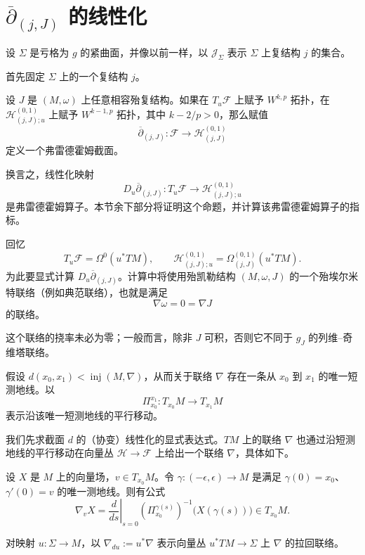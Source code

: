 \section{\texorpdfstring{$\overline\partial_{(j,J)}$}{dbar(j,J)} 的线性化}
\label{sec:linearizations-dbar-jj}
\setcounter{equation}{4}

设 $\Sigma$ 是亏格为 $g$ 的紧曲面，并像以前一样，以 $\mathcal J_\Sigma$ 表示 $\Sigma$ 上复结构 $j$ 的集合。

首先固定 $\Sigma$ 上的一个复结构 $j$。

\begin{proposition}\label{prop:dbar-fredholm-section}
设 $J$ 是 $(M,\omega)$ 上任意相容殆复结构。如果在
$T_u\mathcal F$ 上赋予 $W^{k,p}$ 拓扑，在
$\mathcal H^{(0,1)}_{(j,J);u}$ 上赋予 $W^{k-1,p}$ 拓扑，其中
$k-2/p>0$，那么赋值
\[
 \overline\partial_{(j,J)}:\mathcal F\longrightarrow
 \mathcal H^{(0,1)}_{(j,J)}
\]
定义一个弗雷德霍姆截面。
\end{proposition}

换言之，线性化映射
\[
 D_u\overline\partial_{(j,J)}:
 T_u\mathcal F\longrightarrow\mathcal H^{(0,1)}_{(j,J);u}
\]
是弗雷德霍姆算子。本节余下部分将证明这个命题，并计算该弗雷德霍姆算子的指标。

回忆
\[
 T_u\mathcal F=\Omega^0(u^*TM),
 \qquad
 \mathcal H^{(0,1)}_{(j,J);u}
 =\Omega^{(0,1)}_{(j,J)}(u^*TM).
\]
为此要显式计算 $D_u\overline\partial_{(j,J)}$。计算中将使用殆凯勒结构
$(M,\omega,J)$ 的一个殆埃尔米特联络（例如典范联络），也就是满足
\[
 \nabla\omega=0=\nabla J
\]
的联络。

这个联络的挠率未必为零；一般而言，除非 $J$ 可积，否则它不同于 $g_J$ 的列维--奇维塔联络。

假设 $d(x_0,x_1)<\operatorname{inj}(M,\nabla)$，从而关于联络 $\nabla$ 存在一条从 $x_0$ 到 $x_1$ 的唯一短测地线。以
\[
 \Pi_{x_0}^{x_1}:T_{x_0}M\longrightarrow T_{x_1}M
\]
表示沿该唯一短测地线的平行移动。

我们先求截面 $d$ 的（协变）线性化的显式表达式。$TM$ 上的联络 $\nabla$ 也通过沿短测地线的平行移动在向量丛
$\mathcal H\to\mathcal F$ 上给出一个联络 $\nabla$，具体如下。

设 $X$ 是 $M$ 上的向量场，$v\in T_{x_0}M$。令
$\gamma:(-\epsilon,\epsilon)\to M$ 是满足
$\gamma(0)=x_0$、$\gamma'(0)=v$ 的唯一测地线。则有公式
\[
 \nabla_vX=
 \left.\frac d{ds}\right|_{s=0}
 \left(\Pi_{x_0}^{\gamma(s)}\right)^{-1}
 \bigl(X(\gamma(s))\bigr)\in T_{x_0}M.
\]

对映射 $u:\Sigma\to M$，以
$\nabla_{du}:=u^*\nabla$ 表示向量丛 $u^*TM\to\Sigma$ 上 $\nabla$ 的拉回联络。

